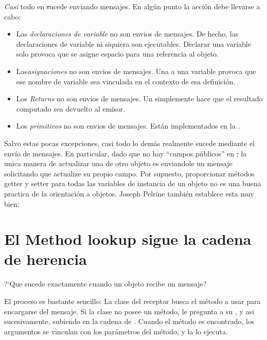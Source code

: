 \documentclass[a4paper,10pt,twoside]{book}
\begin{document}
\emph{Casi} todo en \st sucede enviando mensajes.
En alg\'un punto la acci\'on debe llevarse a cabo:
\begin{itemize}
  \item Las \emph{declaraciones de variable} no son envios de mensajes.
  		De hecho, las declaraciones de variable  ni siquiera son ejecutables.
  		Declarar una variable solo provoca que se asigne espacio para una referencia al objeto.
  \item Las\emph{asignaciones} no son envios de mensajes.
  		Una  a una variable provoca que ese nombre de variable sea vinculada en el contexto  de esa definici\'on.
  \item Los \emph{Returns} no son envios de mensajes.
  		Un  simplemente hace que el resultado computado sea devuelto al emisor.
  \item Los \emph{primitivos} no son envios de mensajes.
  		Est\'an implementados en la .
\end{itemize}
Salvo estas pocas excepciones, casi todo lo dem\'as realmente sucede mediante el env\'io de mensajes.
En particular, dado que no hay ``campos p\'ublicos'' en \st, la unica manera de actualizar una  de otro objeto es enviandole un mensaje solicitando que actualize su propio campo.
Por supuesto, proporcionar m\'etodos getter y setter para todas las variables de instancia de un objeto no es una buena practica de la orientaci\'on a objetos.
Joseph Pelrine tambi\'en establece esta muy bien:

\section{El Method lookup sigue la cadena de herencia} 


?`Que sucede exactamente cuando un objeto recibe un mensaje?

El proceso es bastante sencillo:
La clase del receptor busca el m\'etodo a usar para encargarse del mensaje.
Si la clase no posee un m\'etodo, le pregunta a su , y asi sucesivamente, subiendo en la cadena de .
Cuando el m\'etodo es encontrado, los argumentos se vinculan con los par\'ametros del m\'etodo, y la  lo ejecuta.
\end{document}
